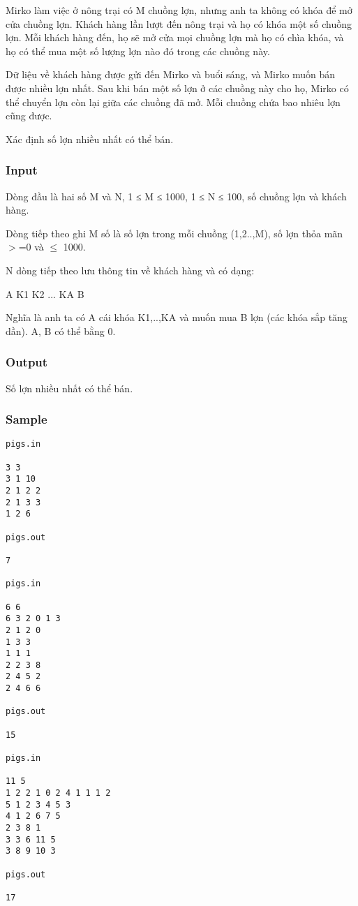 



   Mirko làm việc ở nông trại có M chuồng lợn, nhưng anh ta không có khóa  để mở cửa chuồng lợn. Khách hàng lần lượt đến nông trại và họ có khóa một số chuồng lợn. Mỗi khách hàng đến, họ sẽ mở cửa mọi chuồng lợn mà họ có chìa khóa, và  họ có thể mua một số lượng lợn nào đó trong các chuồng này.  

   Dữ liệu về khách hàng được gửi đến Mirko và buổi sáng, và Mirko muốn bán  được nhiều lợn nhất. Sau khi bán một số lợn ở các chuồng này cho họ, Mirko có thể  chuyển lợn còn lại giữa các chuồng đã mở.  Mỗi chuồng chứa bao nhiêu lợn cũng được.  

   Xác định số lợn nhiều nhất có thể bán.  



\subsubsection{   Input  }

   Dòng đầu là hai số M và N, 1 ≤ M ≤ 1000, 1 ≤ N ≤ 100, số chuồng lợn và khách hàng.  

   Dòng tiếp theo ghi M số là số lợn trong mỗi chuồng (1,2..,M), số lợn thỏa mãn $>$=0 và  $\le$ 1000.  

   N dòng tiếp theo lưu thông tin về khách hàng và có dạng:  

   A K1 K2 ... KA B  

   Nghĩa là anh ta có A cái khóa K1,..,KA và muốn mua B lợn (các khóa sắp  tăng dần). A, B có thể bằng 0.  

\subsubsection{   Output  }

   Số lợn nhiều nhất có thể bán.  

\subsubsection{   Sample  }
\begin{verbatim}
pigs.in 
 
3 3 
3 1 10 
2 1 2 2 
2 1 3 3 
1 2 6 
 
pigs.out
 
7 

pigs.in 
 
6 6 
6 3 2 0 1 3 
2 1 2 0 
1 3 3 
1 1 1 
2 2 3 8 
2 4 5 2 
2 4 6 6 
 
pigs.out 
 
15 

pigs.in 
 
11 5 
1 2 2 1 0 2 4 1 1 1 2 
5 1 2 3 4 5 3 
4 1 2 6 7 5 
2 3 8 1 
3 3 6 11 5 
3 8 9 10 3 
 
pigs.out 
 
17  

\end{verbatim}
